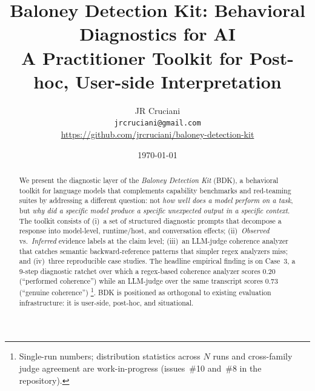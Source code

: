 \documentclass[11pt,letterpaper]{article}
\title{Baloney Detection Kit: Behavioral Diagnostics for AI \\
       \large A Practitioner Toolkit for Post-hoc, User-side Interpretation}
\author{JR Cruciani \\
        \texttt{jrcruciani@gmail.com} \\
        \url{https://github.com/jrcruciani/baloney-detection-kit}}
\date{\today}
\begin{document}
\maketitle

\begin{abstract}
We present the diagnostic layer of the \emph{Baloney Detection Kit} (BDK), a
behavioral toolkit for
language models that complements capability benchmarks and red-teaming
suites by addressing a different question: not \emph{how well does a
model perform on a task}, but \emph{why did a specific model produce a
specific unexpected output in a specific context}. The toolkit consists
of (i)~a set of structured diagnostic prompts that decompose a response
into model-level, runtime/host, and conversation effects;
(ii)~\emph{Observed} vs.\ \emph{Inferred} evidence labels at the
claim level; (iii)~an LLM-judge coherence analyzer that catches
semantic backward-reference patterns that simpler regex analyzers miss;
and (iv)~three reproducible case studies. The headline empirical finding
is on Case~3, a 9-step diagnostic ratchet over which a regex-based
coherence analyzer scores 0.20 (``performed coherence'') while an
LLM-judge over the same transcript scores 0.73 (``genuine coherence'')
\citep{bdk_repo}\footnote{Single-run numbers; distribution
statistics across $N$ runs and cross-family judge agreement are
work-in-progress (issues~\#10 and~\#8 in the repository).}.
BDK is positioned as orthogonal to existing evaluation
infrastructure: it is user-side, post-hoc, and situational.
\end{abstract}












\appendix



\end{document}
